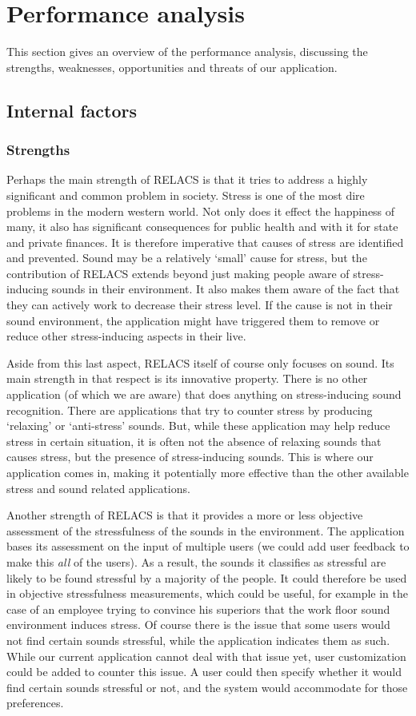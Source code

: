 \documentclass[a4paper]{article}
\begin{document}
\section{Performance analysis}
This section gives an overview of the performance analysis, discussing the strengths, weaknesses, opportunities and threats of our application.

\subsection{Internal factors}
\subsubsection{Strengths}
Perhaps the main strength of RELACS is that it tries to address a highly significant and common problem in society.
Stress is one of the most dire problems in the modern western world.
Not only does it effect the happiness of many, it also has significant consequences for public health and with it for state and private finances.
It is therefore imperative that causes of stress are identified and prevented.
Sound may be a relatively `small' cause for stress, but the contribution of RELACS extends beyond just making people aware of stress-inducing sounds in their environment.
It also makes them aware of the fact that they can actively work to decrease their stress level.
If the cause is not in their sound environment, the application might have triggered them to remove or reduce other stress-inducing aspects in their live.

Aside from this last aspect, RELACS itself of course only focuses on sound.
Its main strength in that respect is its innovative property.
There is no other application (of which we are aware) that does anything on stress-inducing sound recognition.
There are applications that try to counter stress by producing `relaxing' or `anti-stress' sounds.
But, while these application may help reduce stress in certain situation, it is often not the absence of relaxing sounds that causes stress, but the presence of stress-inducing sounds.
This is where our application comes in, making it potentially more effective than the other available stress and sound related applications.

Another strength of RELACS is that it provides a more or less objective assessment of the stressfulness of the sounds in the environment.
The application bases its assessment on the input of multiple users (we could add user feedback to make this \textit{all} of the users).
As a result, the sounds it classifies as stressful are likely to be found stressful by a majority of the people.
It could therefore be used in objective stressfulness measurements, which could be useful,
for example in the case of an employee trying to convince his superiors that the work floor sound environment induces stress.
Of course there is the issue that some users would not find certain sounds stressful, while the application indicates them as such.
While our current application cannot deal with that issue yet, user customization could be added to counter this issue.
A user could then specify whether it would find certain sounds stressful or not, and the system would accommodate for those preferences.
\end{document}
